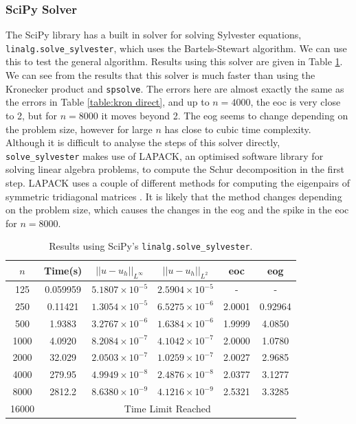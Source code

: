\documentclass[11pt]{article}
\numberwithin{equation}{section}
\begin{document}
\subsubsection*{SciPy Solver}
The SciPy library has a built in solver for solving Sylvester equations, \texttt{linalg.solve\_sylvester}, which uses the Bartels-Stewart algorithm. We can use this to test the general algorithm. Results using this solver are given in Table \ref{table:bartels scipy}. We can see from the results that this solver is much faster than using the Kronecker product and \texttt{spsolve}. The errors here are almost exactly the same as the errors in Table \ref{table:kron direct}, and up to $n=4000$, the eoc is very close to 2, but for $n=8000$ it moves beyond 2. The eog seems to change depending on the problem size, however for large $n$ has close to cubic time complexity. Although it is difficult to analyse the steps of this solver directly, \texttt{solve\_sylvester} makes use of LAPACK, an optimised software library for solving linear algebra problems, to compute the Schur decomposition in the first step. LAPACK uses a couple of different methods for computing the eigenpairs of symmetric tridiagonal matrices \cite{Demmel}. It is likely that the method changes depending on the problem size, which causes the changes in the eog and the spike in the eoc for $n=8000$. 

\begin{table}[H]
\centering
\begin{tabular}{|c|c|c|c|c|c|}
\hline
$n$ & Time(s) & $|| u - u_h ||_{L^{\infty}}$ &$|| u - u_h ||_{L^{2}}$ & eoc & eog \\
\hline
125 & 0.059959 & $5.1807 \times 10^{-5}$ & $2.5904 \times 10^{-5}$ & - & - \\
250 & 0.11421 & $1.3054 \times 10^{-5}$ & $6.5275 \times 10^{-6}$ & 2.0001 & 0.92964 \\
500 & 1.9383 & $3.2767 \times 10^{-6}$ & $1.6384 \times 10^{-6}$ & 1.9999 & 4.0850  \\
1000 & 4.0920 & $8.2084 \times 10^{-7}$ & $4.1042 \times 10^{-7}$ & 2.0000 & 1.0780 \\
2000 & 32.029 & $2.0503 \times 10^{-7}$ & $1.0259 \times 10^{-7}$ & 2.0027 & 2.9685  \\
4000 & 279.95 & $4.9949 \times 10^{-8}$ & $2.4876 \times 10^{-8}$ & 2.0377 & 3.1277  \\
8000 & 2812.2 & $8.6380 \times 10^{-9}$ & $4.1216 \times 10^{-9}$ & 2.5321 & 3.3285 \\
\cline{2-6}
16000 & \multicolumn{5}{c|}{Time Limit Reached} \\
\hline
\end{tabular}
\caption{Results using SciPy's \texttt{linalg.solve\_sylvester}.}
\label{table:bartels scipy}
\end{table}
\end{document}
